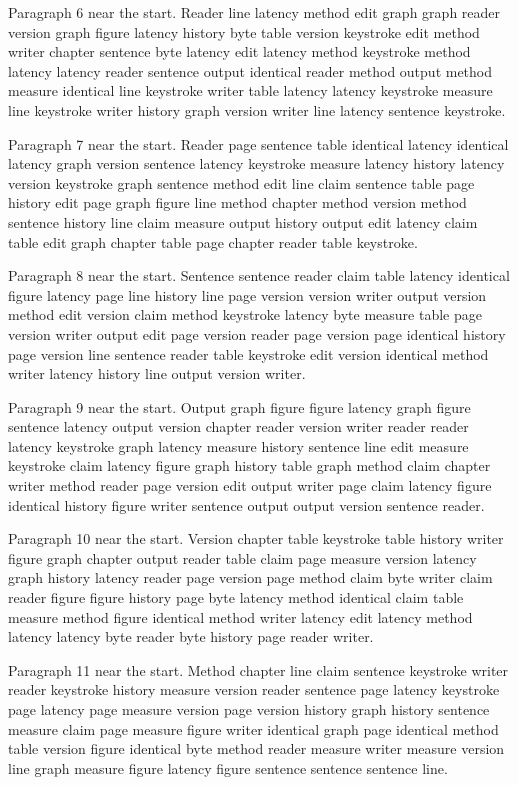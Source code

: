 \documentclass{article}
\begin{document}
Paragraph 6 near the start. Reader line latency method edit graph graph reader version graph figure latency history byte table version keystroke edit method writer chapter sentence byte latency edit latency method keystroke method latency latency reader sentence output identical reader method output method measure identical line keystroke writer table latency latency keystroke measure line keystroke writer history graph version writer line latency sentence keystroke.

Paragraph 7 near the start. Reader page sentence table identical latency identical latency graph version sentence latency keystroke measure latency history latency version keystroke graph sentence method edit line claim sentence table page history edit page graph figure line method chapter method version method sentence history line claim measure output history output edit latency claim table edit graph chapter table page chapter reader table keystroke.

Paragraph 8 near the start. Sentence sentence reader claim table latency identical figure latency page line history line page version version writer output version method edit version claim method keystroke latency byte measure table page version writer output edit page version reader page version page identical history page version line sentence reader table keystroke edit version identical method writer latency history line output version writer.

Paragraph 9 near the start. Output graph figure figure latency graph figure sentence latency output version chapter reader version writer reader reader latency keystroke graph latency measure history sentence line edit measure keystroke claim latency figure graph history table graph method claim chapter writer method reader page version edit output writer page claim latency figure identical history figure writer sentence output output version sentence reader.

Paragraph 10 near the start. Version chapter table keystroke table history writer figure graph chapter output reader table claim page measure version latency graph history latency reader page version page method claim byte writer claim reader figure figure history page byte latency method identical claim table measure method figure identical method writer latency edit latency method latency latency byte reader byte history page reader writer.

Paragraph 11 near the start. Method chapter line claim sentence keystroke writer reader keystroke history measure version reader sentence page latency keystroke page latency page measure version page version history graph history sentence measure claim page measure figure writer identical graph page identical method table version figure identical byte method reader measure writer measure version line graph measure figure latency figure sentence sentence sentence line.
\end{document}
